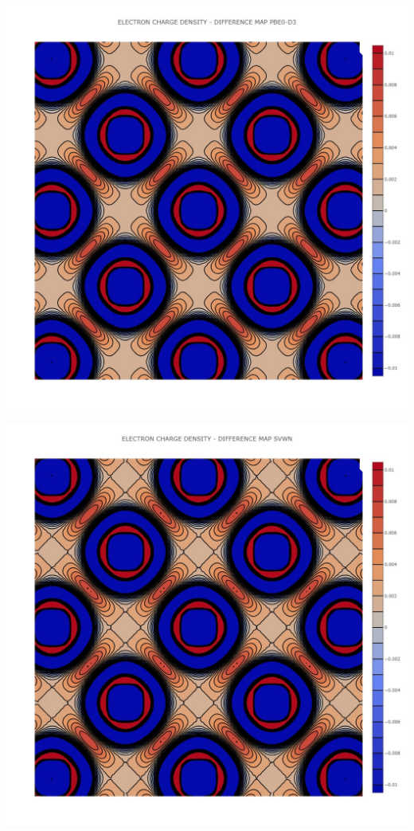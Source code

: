 \documentclass{article}
\begin{document}
\noindent\begin{minipage}{0.45\textwidth}
	\centering
	\includegraphics[width=1\textwidth]{../images/DIFFERENCE CHARGE DENSITY/DIFF CHARGE DENSITY PBE0-D3.jpeg}
	\label{fig:CHARGE_PBE0D3}
\end{minipage}
\hfill
\begin{minipage}{0.45\textwidth}
	\centering
	\includegraphics[width=1\textwidth]{../images/DIFFERENCE CHARGE DENSITY/DIFF CHARGE DENSITY SVWN.jpeg}
	\label{fig:CHARGE_SVWN}
\end{minipage}
\end{document}
